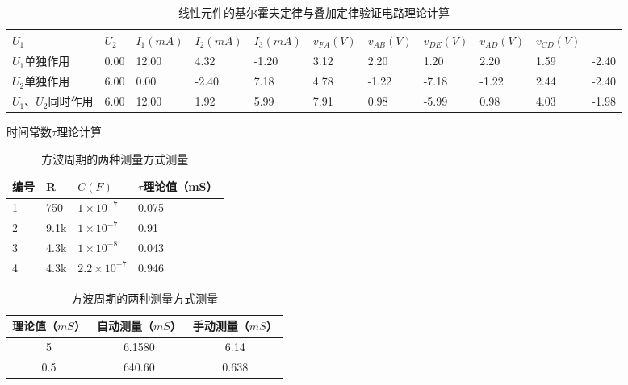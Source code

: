 \documentclass{article}
\begin{document}
    \begin{table}[ht!]
        \footnotesize
        \caption{线性元件的基尔霍夫定律与叠加定律验证电路理论计算} 
        \centering  
        \renewcommand{\arraystretch}{1.2}
        \begin{tabular}{*{11}{l}} 
            \hline\hline   
            $U_1$ & $U_2$ &$I_1(mA)$ &$I_2(mA)$ &$I_3(mA)$ &$v_{FA}(V)$ &$v_{AB}(V)$ &$v_{DE}(V)$ &$v_{AD}(V)$ &$v_{CD}(V)$ \\

            \hline  
            $U_1$单独作用 &0.00 &12.00 &4.32 &-1.20 &3.12 &2.20 &1.20 &2.20 &1.59 &-2.40 \\
            $U_2$单独作用 &6.00 &0.00 &-2.40 &7.18 &4.78 &-1.22 & -7.18 &-1.22 &2.44 &-2.40 \\ 
            $U_1$、$U_2$同时作用 &6.00 &12.00 &1.92 &5.99 &7.91 &0.98 &-5.99 &0.98 &4.03 &-1.98 \\
            \hline
        \end{tabular}
        \label{table:summary05-CI}
    \end{table}

    \begin{table}[htbp]
        \centering
        \begin{minipage}[t]{0.45\textwidth}
            \centering
            \caption{时间常数$\tau$理论计算}
            \renewcommand{\arraystretch}{1.2}
            \begin{tabular}{llll} 
                \hline\hline   
                编号 &R &$C(F)$  &$\tau$理论值（mS） \\
                \hline
                1&750 &$1\times 10^{-7}$ &0.075 \\
                2&9.1k &$1\times 10^{-7}$ &0.91 \\
                3&4.3k &$1\times 10^{-8}$ &0.043 \\
                4&4.3k &$2.2\times 10^{-7}$ &0.946 \\
                \hline
            \end{tabular}
            \label{table:summary05-CI}
    
        \end{minipage}
        \hfill %
        \begin{minipage}[t]{0.45\textwidth}
            \centering
            \caption{方波周期的两种测量方式测量}
            \renewcommand{\arraystretch}{1.2}
        \begin{tabular}{|c|c|c|} 
            \hline\hline   
            理论值（$mS$） &自动测量（$mS$） &手动测量（$mS$）\\
            \hline  
            5 &6.1580 &6.14 \\
            \hline
            0.5 &640.60 &0.638 \\
            \hline
        \end{tabular}
        \label{table:summary05-CI}
        
        \end{minipage}
    \end{table}
\end{document}
